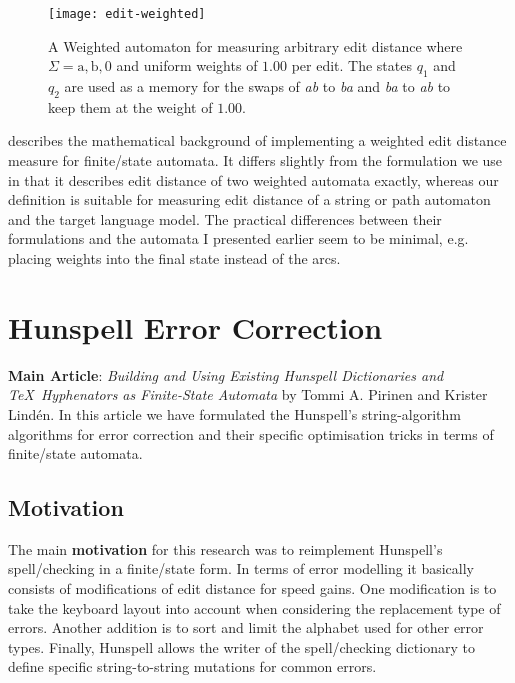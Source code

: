 \documentclass[officiallayout,final]{unihelcompling}
\begin{document}
\begin{figure}
    \texttt{[image: edit-weighted]}
    \caption{A Weighted automaton for measuring arbitrary edit distance where
        $\Sigma = {\mathrm{a}, \mathrm{b}, 0}$ and uniform weights of $1.00$ per
        edit. The states $q_1$ and $q_2$ are used as a memory for
        the swaps of \emph{ab} to \emph{ba} and \emph{ba} to \emph{ab} to
        keep them at the weight of $1.00$. \label{fig:edit-weighted}}
\end{figure}

\citet{mohri2003edit} describes the mathematical background of implementing a
weighted edit distance measure for finite\-/state automata. It differs slightly
from the formulation we use in that it describes edit distance of two weighted
automata exactly, whereas our definition is suitable for measuring edit
distance of a string or path automaton and the target language model. The
practical differences between their formulations and the automata I presented
earlier seem to be minimal, e.g. placing weights into the final state instead
of the arcs.

\section{Hunspell Error Correction}
\label{sec:Hunspell-error}

\textbf{Main Article}: \emph{Building and Using Existing Hunspell Dictionaries
and \TeX\ Hyphenators as Finite-State Automata} by Tommi A. Pirinen and Krister
Lindén.  In this article we have formulated the Hunspell's string-algorithm
algorithms for error correction and their specific optimisation tricks in terms
of finite\-/state automata.

\subsection{Motivation}

The main \textbf{motivation} for this research was to reimplement Hunspell's
spell\-/checking in a finite\-/state form. In terms of error modelling it
basically consists of modifications of edit distance for speed gains.  One
modification is to take the keyboard layout into account when considering the
replacement type of errors. Another addition is to sort and limit the alphabet
used for other error types. Finally, Hunspell allows the writer of the
spell\-/checking dictionary to define specific string-to-string mutations for
common errors.
\end{document}
